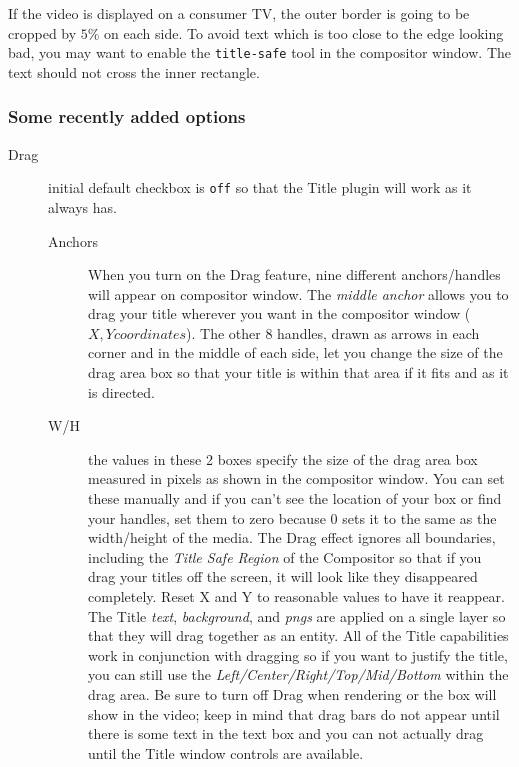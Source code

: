 If the video is displayed on a consumer TV, the outer border is going to be cropped by $5\%$ on each side. To avoid text which is too close to the edge looking bad, you may want to enable the \texttt{title-safe} tool in the compositor window. The text should not cross the inner rectangle.

\subsubsection*{Some recently added options}%
\label{ssub:some_recently_added_options}

\begin{description}
    \item[Drag] initial default checkbox is \texttt{off} so that the Title plugin will work as it always has.
    \begin{description}
        \item[Anchors] When you turn on the Drag feature, nine different anchors/handles will appear on compositor window. The \textit{middle anchor} allows you to drag your title wherever you want in the compositor window ($X, Y coordinates$). The other 8 handles, drawn as arrows in each corner and in the middle of each side, let you change the size of the drag area box so that your title is within that area if it fits and as it is directed.
        \item[W/H] the values in these 2 boxes specify the size of the drag area box measured in pixels as shown in the compositor window. You can set these manually and if you can't see the location of your box or find your handles, set them to zero because $0$ sets it to the same as the width/height of the media.
        The Drag effect ignores all boundaries, including the \textit{Title Safe Region} of the Compositor so that if you drag your titles off the screen, it will look like they disappeared completely. Reset X and Y to reasonable values to have it reappear. The Title \textit{text}, \textit{background}, and \textit{pngs} are applied on a single layer so that they will drag together as an entity. All of the Title capabilities work in conjunction with dragging so if you want to justify the title, you can still use the \textit{Left/Center/Right/Top/Mid/Bottom} within the drag area. Be sure to turn off Drag when rendering or the box will show in the video; keep in mind that drag bars do not appear until there is some text in the text box and you can not actually drag until the Title window controls are available.
    \end{description}

\end{description}
